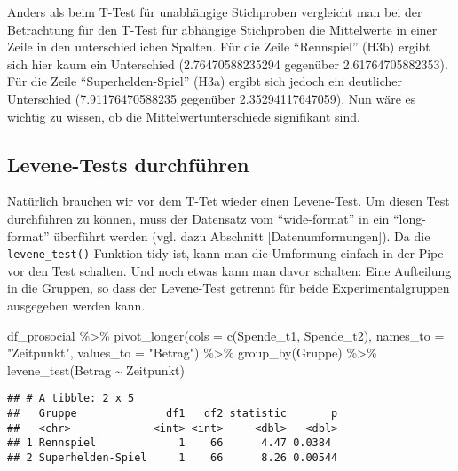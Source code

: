 \documentclass[
]{book}
\newenvironment{Shaded}{\begin{snugshade}}{\end{snugshade}}
\newcommand{\AttributeTok}[1]{\textcolor[rgb]{0.77,0.63,0.00}{#1}}
\newcommand{\FunctionTok}[1]{\textcolor[rgb]{0.00,0.00,0.00}{#1}}
\newcommand{\NormalTok}[1]{#1}
\newcommand{\SpecialCharTok}[1]{\textcolor[rgb]{0.00,0.00,0.00}{#1}}
\newcommand{\StringTok}[1]{\textcolor[rgb]{0.31,0.60,0.02}{#1}}
\begin{document}
Anders als beim T-Test für unabhängige Stichproben vergleicht man bei der Betrachtung für den T-Test für abhängige Stichproben die Mittelwerte in einer Zeile in den unterschiedlichen Spalten. Für die Zeile ``Rennspiel'' (H3b) ergibt sich hier kaum ein Unterschied (2.76470588235294 gegenüber 2.61764705882353). Für die Zeile ``Superhelden-Spiel'' (H3a) ergibt sich jedoch ein deutlicher Unterschied (7.91176470588235 gegenüber 2.35294117647059). Nun wäre es wichtig zu wissen, ob die Mittelwertunterschiede signifikant sind.

\hypertarget{levene-tests-durchfuxfchren}{%
\subsection{Levene-Tests durchführen}\label{levene-tests-durchfuxfchren}}

Natürlich brauchen wir vor dem T-Tet wieder einen Levene-Test. Um diesen Test durchführen zu können, muss der Datensatz vom ``wide-format'' in ein ``long-format'' überführt werden (vgl. dazu Abschnitt {[}Datenumformungen{]}). Da die \texttt{levene\_test()}-Funktion tidy ist, kann man die Umformung einfach in der Pipe vor den Test schalten. Und noch etwas kann man davor schalten: Eine Aufteilung in die Gruppen, so dass der Levene-Test getrennt für beide Experimentalgruppen ausgegeben werden kann.

\begin{Shaded}
\begin{Highlighting}[]
\NormalTok{df\_prosocial }\SpecialCharTok{\%\textgreater{}\%}
  \FunctionTok{pivot\_longer}\NormalTok{(}\AttributeTok{cols =} \FunctionTok{c}\NormalTok{(Spende\_t1, Spende\_t2), }
               \AttributeTok{names\_to =} \StringTok{"Zeitpunkt"}\NormalTok{, }
               \AttributeTok{values\_to =} \StringTok{"Betrag"}\NormalTok{) }\SpecialCharTok{\%\textgreater{}\%} 
  \FunctionTok{group\_by}\NormalTok{(Gruppe) }\SpecialCharTok{\%\textgreater{}\%} 
  \FunctionTok{levene\_test}\NormalTok{(Betrag }\SpecialCharTok{\textasciitilde{}}\NormalTok{ Zeitpunkt)}
\end{Highlighting}
\end{Shaded}

\begin{verbatim}
## # A tibble: 2 x 5
##   Gruppe              df1   df2 statistic       p
##   <chr>             <int> <int>     <dbl>   <dbl>
## 1 Rennspiel             1    66      4.47 0.0384 
## 2 Superhelden-Spiel     1    66      8.26 0.00544
\end{verbatim}
\end{document}
